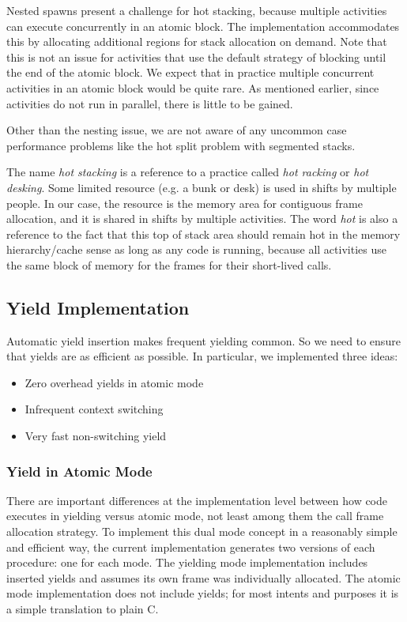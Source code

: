 \documentclass[acmsmall,anonymous,review]{acmart}\settopmatter{printfolios=true,printccs=false,printacmref=false}
\begin{document}
Nested spawns present a challenge for hot stacking, because multiple activities can execute concurrently in an atomic block.
The implementation accommodates this by allocating additional regions for stack allocation on demand.
Note that this is not an issue for activities that use the default strategy of blocking until the end of the atomic block.
We expect that in practice multiple concurrent activities in an atomic block would be quite rare.
As mentioned earlier, since activities do not run in parallel, there is little to be gained.

Other than the nesting issue, we are not aware of any uncommon case performance problems like the hot split problem with segmented stacks.

The name \emph{hot stacking} is a reference to a practice called \emph{hot racking} or \emph{hot desking}.
Some limited resource (e.g. a bunk or desk) is used in shifts by multiple people.
In our case, the resource is the memory area for contiguous frame allocation, and it is shared in shifts by multiple activities.
The word \emph{hot} is also a reference to the fact that this top of stack area should remain hot in the memory hierarchy/cache sense as long as any code is running, because all activities use the same block of memory for the frames for their short-lived calls.

\subsection{Yield Implementation}
\label{sec:yield_imp}

Automatic yield insertion makes frequent yielding common.
So we need to ensure that yields are as efficient as possible.
In particular, we implemented three ideas:

\begin{itemize}
\item Zero overhead yields in atomic mode
\item Infrequent context switching
\item Very fast non-switching yield
\end{itemize}

\subsubsection{Yield in Atomic Mode}

There are important differences at the implementation level between how code executes in yielding versus atomic mode, not least among them the call frame allocation strategy.
To implement this dual mode concept in a reasonably simple and efficient way, the current \charcoal{} implementation generates two versions of each procedure: one for each mode.
The yielding mode implementation includes inserted yields and assumes its own frame was individually allocated.
The atomic mode implementation does not include yields; for most intents and purposes it is a simple translation to plain C.
\end{document}
